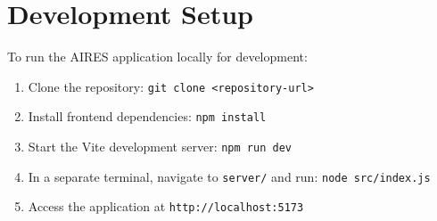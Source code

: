 \section{Development Setup}
To run the AIRES application locally for development:
\begin{enumerate}
    \item Clone the repository: \texttt{git clone <repository-url>}
    \item Install frontend dependencies: \texttt{npm install}
    \item Start the Vite development server: \texttt{npm run dev}
    \item In a separate terminal, navigate to \texttt{server/} and run: \texttt{node src/index.js}
    \item Access the application at \texttt{http://localhost:5173}
\end{enumerate}